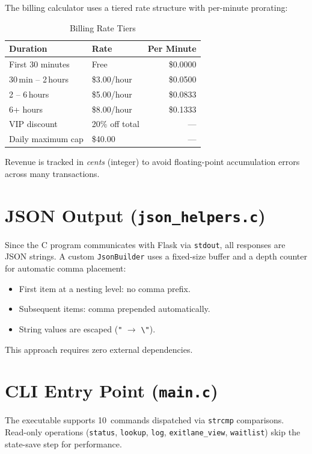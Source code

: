 \documentclass[12pt, a4paper]{report}
\begin{document}
The billing calculator uses a tiered rate structure with per-minute
prorating:

\begin{table}[H]
\centering
\caption{Billing Rate Tiers}
\label{tab:billing}
\begin{tabular}{llr}
\toprule
\textbf{Duration} & \textbf{Rate} & \textbf{Per Minute} \\
\midrule
First 30 minutes    & Free            & \$0.0000 \\
30\,min -- 2\,hours & \$3.00/hour     & \$0.0500 \\
2 -- 6\,hours       & \$5.00/hour     & \$0.0833 \\
6+ hours            & \$8.00/hour     & \$0.1333 \\
\midrule
VIP discount        & 20\% off total  & --- \\
Daily maximum cap   & \$40.00         & --- \\
\bottomrule
\end{tabular}
\end{table}

Revenue is tracked in \emph{cents} (integer) to avoid floating-point
accumulation errors across many transactions.

\section{JSON Output (\texttt{json\_helpers.c})}

Since the C program communicates with Flask via \texttt{stdout}, all
responses are JSON strings.  A custom \texttt{JsonBuilder} uses a
fixed-size buffer and a depth counter for automatic comma placement:

\begin{itemize}[nosep]
  \item First item at a nesting level: no comma prefix.
  \item Subsequent items: comma prepended automatically.
  \item String values are escaped (\texttt{"} $\to$ \texttt{\textbackslash"}).
\end{itemize}

This approach requires zero external dependencies.

\section{CLI Entry Point (\texttt{main.c})}

The executable supports 10~commands dispatched via \texttt{strcmp}
comparisons.  Read-only operations (\texttt{status}, \texttt{lookup},
\texttt{log}, \texttt{exitlane\_view}, \texttt{waitlist}) skip the
state-save step for performance.
\end{document}
